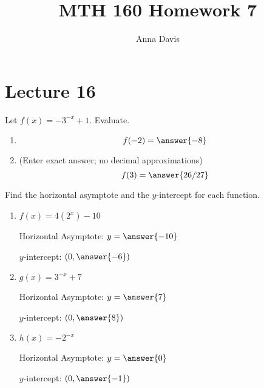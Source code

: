 \documentclass{ximera}
\author{Anna Davis} \title{MTH 160 Homework 7}
\begin{document}
\begin{abstract}

\end{abstract}
\maketitle

 \section{Lecture 16}
 
  \begin{problem}\label{prob:160hom7prob1} 
Let $f(x)=-3^{-x}+1$.  Evaluate.
  \begin{enumerate}
\item
 $$f(-2)=\answer{-8}$$
\item (Enter exact answer; no decimal approximations)
$$f(3)=\answer{26/27}$$
  \end{enumerate}
\end{problem}  
   \begin{problem}\label{prob:160hom7prob2}
 Find the horizontal asymptote and the $y$-intercept for each function.
 \begin{enumerate}
     \item $f(x)=4(2^x)-10$
     
     Horizontal Asymptote: $y=\answer{-10}$
     
     $y$-intercept: $(0, \answer{-6})$
     \item $g(x)=3^{-x}+7$
     
     Horizontal Asymptote: $y=\answer{7}$
     
     $y$-intercept: $(0, \answer{8})$
     \item $h(x)=-2^{-x}$
     
     Horizontal Asymptote: $y=\answer{0}$
     
     $y$-intercept: $(0, \answer{-1})$
 \end{enumerate}
   \end{problem}
\end{document}
